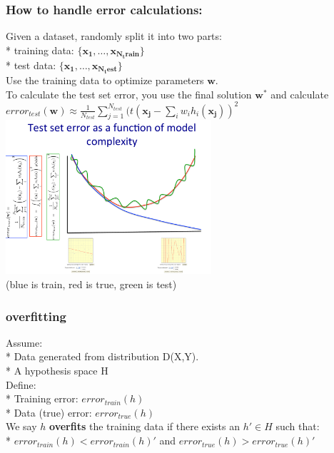 \subsubsection{How to handle error calculations:}
Given a dataset, randomly split it into two parts:  \hfill \\
* training data: $\{ \bm{x_1}, \dots, \bm{x_{N_train}} \}$   \hfill \\
* test data: $\{ \bm{x_1}, \dots, \bm{x_{N_test}} \}$   \hfill \\
Use the training data to optimize parameters $\bm{w}$. \hfill \\
To calculate the test set error, you use the final solution $\bm{w^*}$ and calculate \hfill \\
$\displaystyle error_{test}(\bm{w}) \approx \frac{1}{N_{test}} \sum_{j=1}^{N_{test}} (t(\bm{x_j} - \sum_i w_i h_i(\bm{x_j}))^2$  \hfill \\

\includegraphics[width=3in]{figures/errors_as_f_of_complexity.pdf}   \hfill \\
(blue is train, red is true, green is test) \hfill \\

\subsubsection{overfitting}
Assume: \hfill \\
* Data generated from distribution D(X,Y). \hfill \\
* A hypothesis space H \hfill \\
Define:  \hfill \\
* Training error: $error_{train}(h)$ \hfill \\
* Data (true) error: $error_{true}(h)$ \hfill \\
We say $h$ \textbf{overfits} the training data if there exists an $h' \in H$ such that:  \hfill \\ 
* $error_{train}(h) < error_{train}(h)'$ and $error_{true}(h) > error_{true}(h)'$

